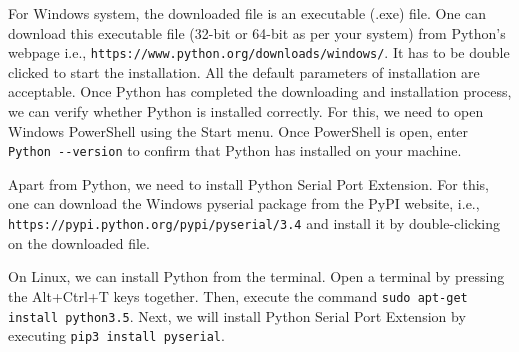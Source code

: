 For Windows system, the downloaded file is an executable (.exe) file. One can download 
this executable file (32-bit or 64-bit as per your system) from Python's webpage i.e.,
{\tt https://www.python.org/downloads/windows/}. 
It has to be double clicked to start the installation. All the default parameters of installation
are acceptable. Once Python has completed the downloading and installation process, we can verify whether
Python is installed correctly. For this, we need to open Windows PowerShell using the Start menu. 
Once PowerShell is open, enter {\tt Python -{}-version} to confirm that Python has installed on your machine. 

Apart from Python, we need to install Python Serial Port Extension. 
For this, one can download the
Windows pyserial package from the PyPI website, i.e., {\tt https://pypi.python.org/pypi/pyserial/3.4} and 
install it by double-clicking on the downloaded file. 

On Linux, we can install Python from the terminal. Open a terminal by pressing the Alt+Ctrl+T keys together. Then, 
execute the command {\tt sudo apt-get install python3.5}. Next, we will install Python Serial Port Extension by 
executing {\tt pip3 install pyserial}. 

            
            
            
            
            
            
